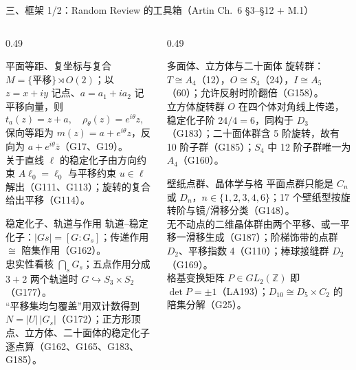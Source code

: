 \documentclass[aspectratio=169,10pt,fontset=none]{ctexbeamer}
\begin{document}
\begin{frame}[t]{三、框架 1/2：Random Review 的工具箱（Artin Ch.~6 \S3--\S12 + M.1）}
  \label{sec:framework1}
  \begin{columns}[T,onlytextwidth]
    \begin{column}{0.49\textwidth}
      \begin{block}{\footnotesize 平面等距、复坐标与复合}
        \scriptsize
        $M=\{\text{平移}\}\rtimes O(2)$；以 $z=x+iy$ 记点、$a=a_1+ia_2$ 记平移向量，则
        \[ t_a(z)=z+a,\quad \rho_\theta(z)=e^{i\theta}z,\quad r(z)=\overline z, \]
        保向等距为 $m(z)=a+e^{i\theta}z$，反向为 $a+e^{i\theta}\overline z$（G17、G19）。\\
        关于直线 $\ell$ 的稳定化子由方向约束 $A\ell_0=\ell_0$ 与平移约束 $u\in\ell$ 解出（G111、G113）；旋转的复合给出平移（G114）。
      \end{block}
      \begin{block}{\footnotesize 稳定化子、轨道与作用}
        \scriptsize
        轨道–稳定化子：$|Gs|=[G:G_s]$；传递作用 $\cong$ 陪集作用（G162）。\\
        忠实性看核 $\bigcap_s G_s$；五点作用分成 $3+2$ 两个轨道时 $G\hookrightarrow S_3\times S_2$（G177）。\\
        “平移集均匀覆盖”用双计数得到 $N=|U|\,|G_s|$（G172）；正方形顶点、立方体、二十面体的稳定化子逐点算（G162、G165、G183、G185）。
      \end{block}
    \end{column}
    \begin{column}{0.49\textwidth}
      \begin{block}{\footnotesize 多面体、立方体与二十面体}
        \scriptsize
        旋转群：$T\cong A_4$（12），$O\cong S_4$（24），$I\cong A_5$（60）；允许反射时阶翻倍（G158）。\\
        立方体旋转群 $O$ 在四个体对角线上传递，稳定化子阶 $24/4=6$，同构于 $D_3$（G183）；二十面体群含 5 阶旋转，故有 10 阶子群（G185）；$S_4$ 中 12 阶子群唯一为 $A_4$（G160）。
      \end{block}
      \begin{block}{\footnotesize 壁纸点群、晶体学与格}
        \scriptsize
        平面点群只能是 $C_n$ 或 $D_n$，$n\in\{1,2,3,4,6\}$；17 个壁纸型按旋转阶与镜/滑移分类（G148）。\\
        无不动点的二维晶体群由两个平移、或一平移一滑移生成（G187）；阶梯饰带的点群 $D_2$、平移指数 4（G110）；棒球接缝群 $D_2$（G169）。\\
        格基变换矩阵 $P\in GL_2(\mathbb Z)$ 即 $\det P=\pm1$（LA193）；$D_{10}\cong D_5\times C_2$ 的陪集分解（G25）。
      \end{block}
    \end{column}
  \end{columns}
\end{frame}
\end{document}
